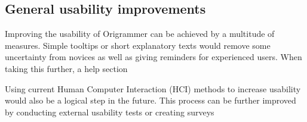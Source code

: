 \subsection{General usability improvements}

Improving the usability of Origrammer can be achieved by a multitude of measures.
Simple tooltips or short explanatory texts would remove some uncertainty from novices as well as giving reminders for experienced users. When taking this further, a help section

Using current Human Computer Interaction (HCI) methods to increase usability would also be a logical step in the future. This process can be further improved by conducting external usability tests or creating surveys